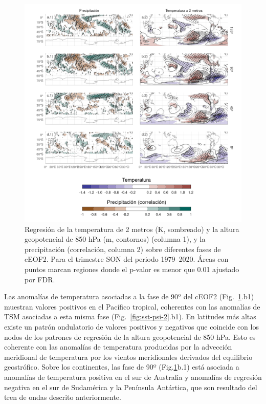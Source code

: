 \documentclass[12pt,oneside,a4paper]{reedthesis}
\begin{document}
\begin{figure}

{\centering \includegraphics{figures/20-ceofs/pp-temp-2-1} 

}

\caption{Regresión de la temperatura de 2 metros (K, sombreado) y la altura geopotencial de 850 hPa (m, contornos) (columna 1), y la precipitación (correlación, columna 2) sobre diferentes fases de cEOF2. Para el trimestre SON del periodo 1979--2020. Áreas con puntos marcan regiones donde el p-valor es menor que 0.01 ajustado por FDR.}\label{fig:pp-temp-2}
\end{figure}

Las anomalías de temperatura asociadas a la fase de 90º del cEOF2 (Fig.~\ref{fig:pp-temp-2}.b1) muestran valores positivos en el Pacífico tropical, coherentes con las anomalías de TSM asociadas a esta misma fase (Fig.~\ref{fig:sst-psi-2}.b1).
En latitudes más altas existe un patrón ondulatorio de valores positivos y negativos que coincide con los nodos de los patrones de regresión de la altura geopotencial de 850 hPa.
Esto es coherente con las anomalías de temperatura producidas por la advección meridional de temperatura por los vientos meridionales derivados del equilibrio geostrófico.
Sobre los continentes, las fase de 90º (Fig.\ref{fig:pp-temp-2}b.1) está asociada a anomalías de temperatura positiva en el sur de Australia y anomalías de regresión negativa en el sur de Sudamérica y la Península Antártica, que son resultado del tren de ondas descrito anteriormente.
\end{document}
